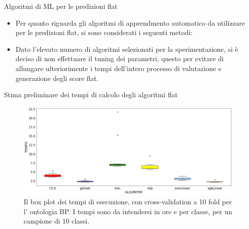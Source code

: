 \documentclass[9pt]{beamer}
\begin{document}
\begin{tframe}{Algoritmi di ML per le predizioni flat}
\begin{itemize}
\item Per quanto riguarda gli algoritmi di apprendmento automatico da utilizzare per le predizioni flat, si sono considerati i seguenti metodi:
\item Dato l'elevato numero di algoritmi selezionati per la sperimentazione, si è deciso di non effettuare il tuning dei parametri, questo per evitare di allungare ulteriorimente i tempi dell'intero processo di valutazione e generazione degli score flat.
\end{itemize}
\end{tframe}

\begin{tframe}{Stima preliminare dei tempi di calcolo degli algoritmi flat}
\begin{figure}[hp!]
\center
\includegraphics[scale=0.25]{../images/BP_box_plot_times.png}

\caption{\footnotesize{Il box plot dei tempi di esecuzione, con cross-validation a 10 fold per l' ontologia BP. I tempi sono da intendersi in ore e per classe, per un campione di 10 classi.}}
\label{boxplot_p}
\end{figure}
\end{tframe}
\end{document}
